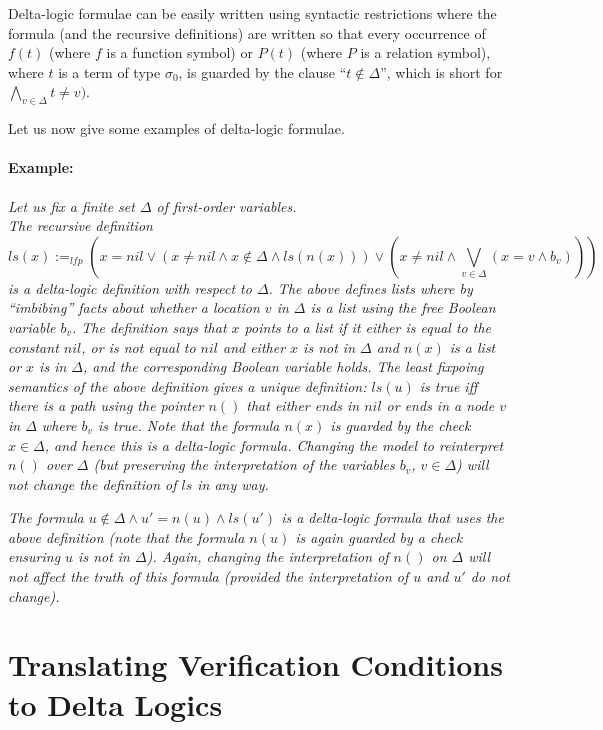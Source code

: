 Delta-logic formulae can be easily written using syntactic restrictions where the formula (and the recursive definitions)
are written so that every occurrence of $f(t)$ (where $f$ is a function symbol) or $P(t)$ (where $P$ is a relation symbol),
where $t$ is a term of type $\sigma_0$, 
is guarded by the clause ``$t \not \in \Delta$'', which is short for $\bigwedge_{v \in \Delta} t \not = v)$.

\noindent Let us now give some examples of delta-logic formulae.

\paragraph{Example:}
\emph{
Let us fix a finite set $\Delta$ of first-order variables.\\
The recursive definition $$\textit{ls}(x) :=_{\textit{lfp}} (x=\textit{nil} \vee (x \not = nil \wedge x \not \in \Delta \wedge \textit{ls}(n(x))) 
 \vee (x \not = nil \wedge \bigvee_{v \in \Delta} (x\!=\!v \wedge b_v)))$$ 
 is a delta-logic definition with respect to $\Delta$.
The above defines lists where by ``imbibing'' facts about whether a location $v$ in $\Delta$ is a list using the
free Boolean variable $b_v$. The definition says that $x$ points to a list if it either is equal to the constant $\textit{nil}$,
or is not equal to $\textit{nil}$ and either $x$ is not in $\Delta$ and $n(x)$ is a list or $x$ is in $\Delta$, and the corresponding
Boolean variable holds. The least fixpoing semantics of the above definition gives a unique definition: $ls(u)$ is true iff
there is a path using the pointer $n()$ that either ends in $\textit{nil}$ or ends in a node $v$ in $\Delta$ where $b_v$ is true. 
Note that the formula $n(x)$ is guarded by the check $x \in \Delta$, and hence this is a delta-logic formula.
Changing the model to reinterpret $n()$ over $\Delta$ (but preserving the interpretation of the variables $b_v$, $v \in \Delta$) 
will not change the definition of $\textit{ls}$ in any way.
}

\emph{The formula $u \not \in \Delta \wedge u'\!\!=\!\!n(u) \wedge \textit{ls}(u')$ is a delta-logic formula that uses the above definition
	(note that the formula $n(u)$ is again guarded by a check ensuring $u$ is not in $\Delta$). Again, changing the interpretation 
	 of $n()$ on $\Delta$ will not affect the truth of this formula (provided the interpretation of $u$ and $u'$ do not change).
}


\section{Translating Verification Conditions to Delta Logics}


